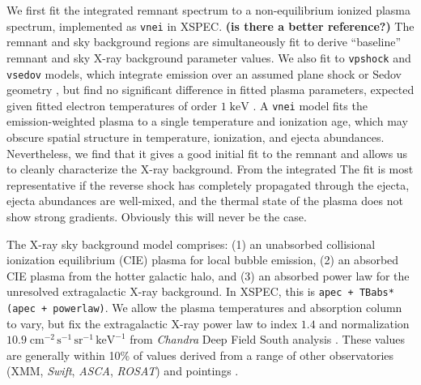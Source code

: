 \documentclass[preprint2,tighten,trackchanges]{aastex6}
\newcommand*{\mt}{\mathrm}
\newcommand*{\unit}[1]{\;\mt{#1}}  %
\begin{document}
We first fit the integrated remnant spectrum to a non-equilibrium ionized
plasma spectrum, implemented as \texttt{vnei} \citep{hamilton1983} in XSPEC.
\textbf{(is there a better reference?)}
The remnant and sky background regions are simultaneously fit
to derive ``baseline'' remnant and sky X-ray background parameter values.
We also fit to \texttt{vpshock} and \texttt{vsedov} models, which integrate
emission over an assumed plane shock or Sedov geometry \citep{borkowski2001},
but find no significant difference in fitted plasma parameters, expected given
fitted electron temperatures of order $1 \unit{keV}$ \citep{borkowski2001}.
A \texttt{vnei} model fits the emission-weighted plasma to a single temperature
and ionization age, which may obscure spatial structure in temperature,
ionization, and ejecta abundances.
Nevertheless, we find that it gives a good initial fit to the remnant and
allows us to cleanly characterize the X-ray background.
From the integrated
The fit is most representative if the reverse shock has completely propagated
through the ejecta, ejecta abundances are well-mixed, and the thermal state of
the plasma does not show strong gradients.
Obviously this will never be the case.


The X-ray sky background model comprises:
(1) an unabsorbed collisional ionization equilibrium (CIE) plasma for local
bubble emission,
(2) an absorbed CIE plasma from the hotter galactic halo,
and
(3) an absorbed power law for the unresolved extragalactic X-ray background.
In XSPEC, this is \texttt{apec + TBabs*(apec + powerlaw)}.
We allow the plasma temperatures and absorption column to vary,
but fix the extragalactic X-ray power law to index $1.4$ and normalization
$10.9 \unit{cm^{-2}\, s^{-1}\, sr^{-1}\, keV^{-1}}$ from \textit{Chandra} Deep Field
South analysis \citep{hickox2006}.
These values are generally within 10\% of values derived from a range of other
observatories (XMM, \textit{Swift}, \textit{ASCA}, \textit{ROSAT}) and
pointings \citep[e.g.,][]{chen1997, kushino2002, de-luca2004, moretti2009}.
\end{document}
